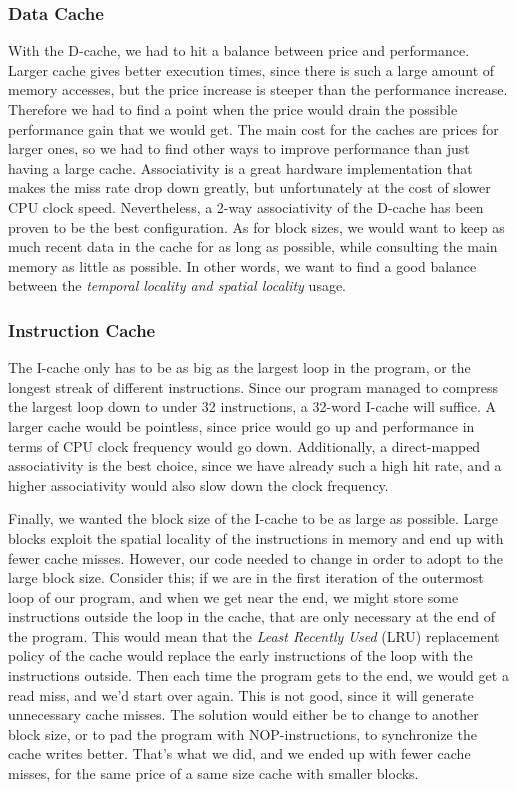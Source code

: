 \documentclass[a4paper,9pt,fleqn]{article}
\begin{document}
\subsubsection{Data Cache}
With the D-cache, we had to hit a balance between price and performance. Larger cache gives better 
execution times, since there is such a large amount of memory accesses, but the price increase is steeper 
than the performance increase. Therefore we had to find a point when the price would drain the possible 
performance gain that we would get. The main cost for the caches are prices for larger ones, so we had to 
find other ways to improve performance than just having a large cache. Associativity is a great hardware 
implementation that makes the miss rate drop down greatly, but unfortunately at the cost of slower CPU 
clock speed. Nevertheless, a 2-way associativity of the D-cache has been proven to be the  best 
configuration. As for block sizes, we would want to keep as much recent data in the cache for as long as 
possible, while consulting the main memory as little as possible. In other words, we want to find a good 
balance between the {\it temporal locality and spatial locality} usage. 

\subsubsection{Instruction Cache}
The I-cache only has to be as big as the largest loop in the program, or the longest streak of different 
instructions. Since our program managed to compress the largest loop down to under 32 instructions, a 
32-word I-cache will suffice. A larger cache would be pointless, since price would go up and performance 
in terms of CPU clock frequency would go down. Additionally, a direct-mapped associativity is the best 
choice, since we have already such a high hit rate, and a higher associativity would also slow down the 
clock frequency.

Finally, we wanted the block size of the I-cache to be as large as possible. Large blocks exploit the spatial 
locality of the instructions in memory and end up with fewer cache misses. However, our code needed to 
change in order to adopt to the large block size. Consider this; if we are in the first iteration of the 
outermost loop of our program, and when we get near the end, we might store some instructions outside 
the loop in the cache, that are only necessary at the end of the program. This would mean that the {\it 
Least Recently Used} (LRU) replacement policy of the cache would replace the early instructions of the 
loop with the instructions outside. Then each time the program gets to the end, we would get a read miss, 
and we'd start over again. This is not good, since it will generate unnecessary cache misses. The solution 
would either be to change to another block size, or to pad the program with NOP-instructions, to 
synchronize the cache writes better. That's what we did, and we ended up with fewer cache misses, for 
the same price of a same size cache with smaller blocks.
\end{document}

